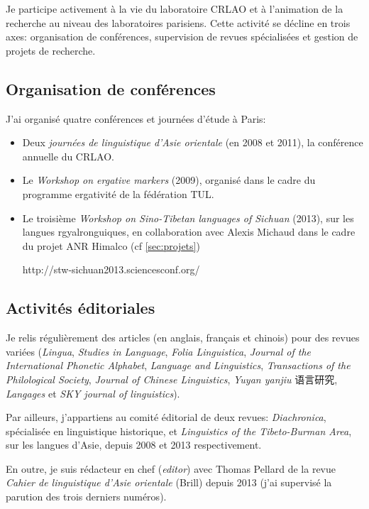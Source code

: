 \documentclass[oldfontcommands,oneside,a4paper,11pt]{article}
\newcommand{\zh}[1]{{\cn #1}}
\begin{document}
Je participe activement à la vie du laboratoire CRLAO et à l'animation de la recherche au niveau des laboratoires parisiens. Cette activité se décline en trois axes: organisation de conférences, supervision de revues spécialisées et gestion de projets de recherche.

\subsection{Organisation de conférences} \label{sec:conf}

J'ai organisé quatre conférences et journées d'étude à Paris:

\begin{itemize}
\item Deux \textit{journées de linguistique d'Asie orientale} (en 2008 et 2011), la conférence annuelle du CRLAO.
\item Le \textit{Workshop on ergative markers} (2009), organisé dans le cadre du programme ergativité de la fédération TUL.
\item Le troisième \textit{Workshop on Sino-Tibetan languages of Sichuan} (2013), sur les langues rgyalronguiques, en collaboration avec Alexis Michaud dans le cadre du projet ANR Himalco (cf \ref{sec:projets})

  http://stw-sichuan2013.sciencesconf.org/ 
\end{itemize}



\subsection{Activités éditoriales}\label{sec:editorial}
Je relis régulièrement des articles (en anglais, français et chinois) pour des revues variées (\textit{Lingua}, \textit{Studies in Language}, \textit{Folia Linguistica}, \textit{Journal of the International Phonetic Alphabet},  \textit{Language and Linguistics}, \textit{Transactions of the Philological Society}, \textit{Journal of Chinese Linguistics}, \textit{Yuyan yanjiu} \zh{语言研究}, \textit{Langages} et  \textit{SKY journal of linguistics}).

Par ailleurs, j'appartiens au comité éditorial de deux revues: \textit{Diachronica}, spécialisée en linguistique historique, et \textit{Linguistics of the Tibeto-Burman Area}, sur les langues d'Asie, depuis 2008 et 2013 respectivement.

En outre, je suis rédacteur en chef (\textit{editor}) avec Thomas Pellard de la revue  \textit{Cahier de linguistique d'Asie orientale} (Brill) depuis 2013 (j'ai supervisé la parution des trois derniers numéros). 
\end{document}
